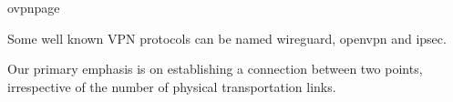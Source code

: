 \ac{ovpnpage}

Some well known VPN protocols can be named wireguard, openvpn and ipsec. 

Our primary emphasis is on establishing a connection between two points, irrespective of the number of physical transportation links.

















